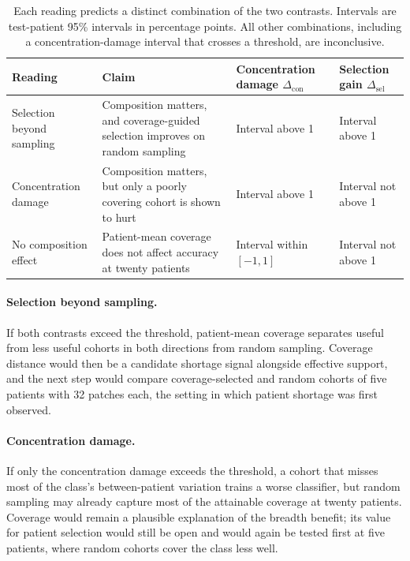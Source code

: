 \documentclass[11pt]{article}
\begin{document}
\begin{table}[htbp]
\centering
\renewcommand{\arraystretch}{1.15}
\begin{tabularx}{\textwidth}{@{}lYYY@{}}
\toprule
Reading & Claim & Concentration damage $\Delta_{\mathrm{con}}$ & Selection gain $\Delta_{\mathrm{sel}}$ \\
\midrule
Selection beyond sampling & Composition matters, and coverage-guided selection improves on random sampling & Interval above 1 & Interval above 1 \\
\addlinespace
Concentration damage & Composition matters, but only a poorly covering cohort is shown to hurt & Interval above 1 & Interval not above 1 \\
\addlinespace
No composition effect & Patient-mean coverage does not affect accuracy at twenty patients & Interval within $[-1,1]$ & Interval not above 1 \\
\bottomrule
\end{tabularx}
\caption{Each reading predicts a distinct combination of the two contrasts. Intervals are test-patient 95\% intervals in percentage points. All other combinations, including a concentration-damage interval that crosses a threshold, are inconclusive.}
\label{tab:readings}
\end{table}

\paragraph{Selection beyond sampling.}
If both contrasts exceed the threshold, patient-mean coverage separates useful from less useful cohorts in both directions from random sampling. Coverage distance would then be a candidate shortage signal alongside effective support, and the next step would compare coverage-selected and random cohorts of five patients with 32 patches each, the setting in which patient shortage was first observed.

\paragraph{Concentration damage.}
If only the concentration damage exceeds the threshold, a cohort that misses most of the class's between-patient variation trains a worse classifier, but random sampling may already capture most of the attainable coverage at twenty patients. Coverage would remain a plausible explanation of the breadth benefit; its value for patient selection would still be open and would again be tested first at five patients, where random cohorts cover the class less well.
\end{document}
